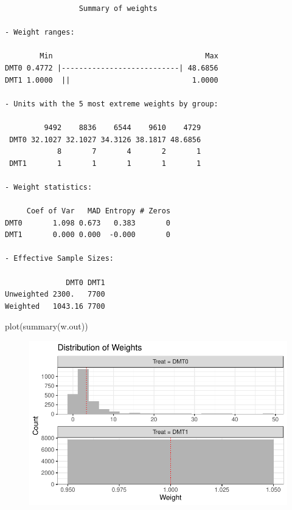 \documentclass[
  letterpaper,
  DIV=11,
  numbers=noendperiod]{scrreprt}
\newenvironment{Shaded}{\begin{snugshade}}{\end{snugshade}}
\newcommand{\FunctionTok}[1]{\textcolor[rgb]{0.28,0.35,0.67}{#1}}
\newcommand{\NormalTok}[1]{\textcolor[rgb]{0.00,0.23,0.31}{#1}}
\begin{document}
\begin{verbatim}
                 Summary of weights

- Weight ranges:

        Min                                   Max
DMT0 0.4772 |---------------------------| 48.6856
DMT1 1.0000  ||                            1.0000

- Units with the 5 most extreme weights by group:
                                             
         9492    8836    6544    9610    4729
 DMT0 32.1027 32.1027 34.3126 38.1817 48.6856
            8       7       4       2       1
 DMT1       1       1       1       1       1

- Weight statistics:

     Coef of Var   MAD Entropy # Zeros
DMT0       1.098 0.673   0.383       0
DMT1       0.000 0.000  -0.000       0

- Effective Sample Sizes:

              DMT0 DMT1
Unweighted 2300.   7700
Weighted   1043.16 7700
\end{verbatim}

\begin{Shaded}
\begin{Highlighting}[]
\FunctionTok{plot}\NormalTok{(}\FunctionTok{summary}\NormalTok{(w.out))}
\end{Highlighting}
\end{Shaded}

\begin{figure}[H]

{\centering \includegraphics{chapter_06_files/figure-pdf/unnamed-chunk-34-1.pdf}

}

\end{figure}
\end{document}
